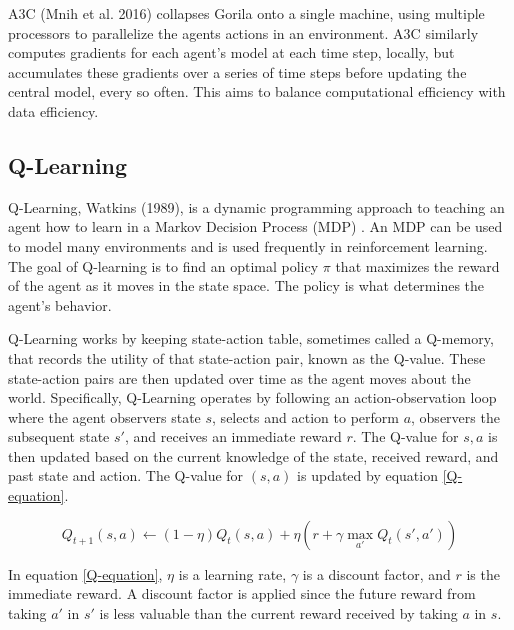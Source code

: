 \documentclass[jair,twoside,11pt,theapa]{article}
\begin{document}
A3C (Mnih et al. 2016)\nocite{A3C} collapses Gorila onto a single machine, using multiple processors to parallelize the agents actions in an environment. A3C similarly computes gradients for each agent's model at each time step, locally, but accumulates these gradients over a series of time steps before updating the central model, every so often. This aims to balance computational efficiency with data efficiency. 

\subsection{Q-Learning}
\label{Q-Learning}
Q-Learning, Watkins (1989)\nocite{watkins}, is a dynamic programming approach to teaching an agent how to learn in a Markov Decision Process (MDP) \cite{Bellman}. An MDP can be used to model many environments and is used frequently in reinforcement learning. The goal of Q-learning is to find an optimal policy $\pi$ that maximizes the reward of the agent as it moves in the state space. The policy is what determines the agent's behavior. 

Q-Learning works by keeping state-action table, sometimes called a Q-memory, that records the utility of that state-action pair, known as the Q-value. These state-action pairs are then updated over time as the agent moves about the world. Specifically, Q-Learning operates by following an action-observation loop where the agent observers state $s$, selects and action to perform $a$, observers the subsequent state $s'$, and receives an immediate reward $r$. The Q-value for $s,a$ is then updated based on the current knowledge of the state, received reward, and past state and action. The Q-value for $(s,a)$ is updated by equation \ref{Q-equation}.

\begin{equation}
\label{Q-equation}
Q_{t+1}(s,a) \leftarrow (1-\eta)Q_t(s,a) + \eta(r + \gamma \max_{a'} Q_t(s',a'))
\end{equation}

In equation \ref{Q-equation}, $\eta$ is a learning rate, $\gamma$ is a discount factor, and $r$ is the immediate reward. A discount factor is applied since the future reward from taking $a'$ in $s'$ is less valuable than the current reward received by taking $a$ in $s$. 
\end{document}
